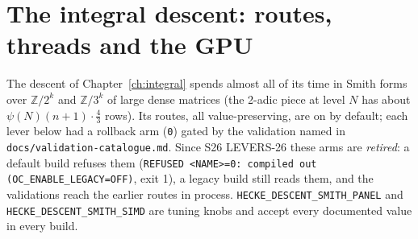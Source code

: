 \documentclass[11pt,openany]{report}
\newcommand{\Z}{\mathbb{Z}}
\newcommand{\file}[1]{\nolinkurl{#1}}
\begin{document}
\section{The integral descent: routes, threads and the GPU}\label{sec:env-descent}

The descent of Chapter~\ref{ch:integral} spends almost all of its time in Smith forms over $\Z/2^k$ and $\Z/3^k$ of large
dense matrices (the 2-adic piece at level $N$ has about $\psi(N)(n+1)\cdot\tfrac43$ rows). Its routes, all value-preserving,
are on by default; each lever below had a rollback arm (\texttt{0}) gated by the validation named in
\file{docs/validation-catalogue.md}. Since S26 LEVERS-26 these arms are \emph{retired}: a default build refuses them
(\texttt{REFUSED <NAME>=0: compiled out (OC\_ENABLE\_LEGACY=OFF)}, exit 1), a legacy build still reads them, and the validations
reach the earlier routes in process. \texttt{HECKE\_DESCENT\_SMITH\_PANEL} and \texttt{HECKE\_DESCENT\_SMITH\_SIMD} are tuning knobs and
accept every documented value in every build.
\end{document}
